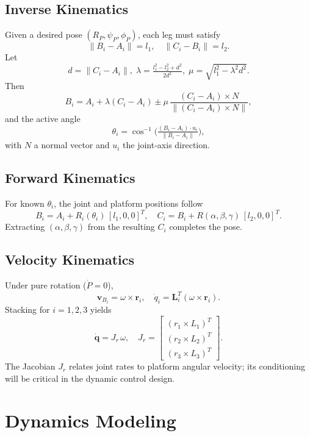 \documentclass[letterpaper, 10 pt, conference]{ieeeconf}  %
\begin{document}
\subsection{Inverse Kinematics}
\label{sec:ik}
Given a desired pose \((R_P,\psi_{P},\phi_{P})\), each leg must satisfy
\[
  \|B_i - A_i\| = l_1, 
  \quad 
  \|C_i - B_i\| = l_2.
\]
Let
\[
  d = \|C_i - A_i\|,\;
  \lambda = \tfrac{l_1^2 - l_2^2 + d^2}{2d^2},\;
  \mu = \sqrt{l_1^2 - \lambda^2 d^2}.
\]
Then
\[
  B_i = A_i + \lambda(C_i - A_i)
       \pm \mu\,
       \frac{(C_i - A_i)\times N}{\|(C_i - A_i)\times N\|},
\]
and the active angle
\[
  \theta_i = \cos^{-1}\!\bigl(\tfrac{(B_i - A_i)\cdot u_i}{\|B_i - A_i\|}\bigr),
\]
with \(N\) a normal vector and \(u_i\) the joint‑axis direction.

\subsection{Forward Kinematics}
\label{sec:fk}
For known \(\theta_i\), the joint and platform positions follow
\[
  B_i = A_i + R_i(\theta_i)\,[l_1,0,0]^T,\quad
  C_i = B_i + R(\alpha,\beta,\gamma)\,[l_2,0,0]^T.
\]
Extracting \((\alpha,\beta,\gamma)\) from the resulting \(C_i\) completes the pose.

\subsection{Velocity Kinematics}
\label{sec:vel-kin}
Under pure rotation (\(\dot P=0\)), 
\[
  \mathbf v_{B_i} = \omega\times \mathbf r_i,
  \quad
  \dot q_i = \mathbf L_i^{T}(\omega\times \mathbf r_i).
\]
Stacking for \(i=1,2,3\) yields
\[
  \dot{\mathbf q} = J_r\,\omega,\quad
  J_r = 
  \begin{bmatrix}
    (r_1\times L_1)^T\\
    (r_2\times L_2)^T\\
    (r_3\times L_3)^T
  \end{bmatrix}.
\]
The Jacobian \(J_r\) relates joint rates to platform angular velocity; its conditioning will be critical in the dynamic control design.





\section{Dynamics Modeling}
\label{sec:dynamics}
\end{document}
